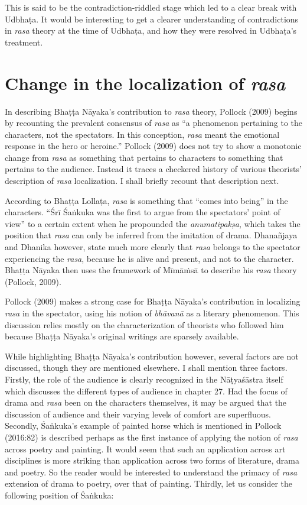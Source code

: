 This is said to be the contradiction-riddled stage which led to a clear break with Udbhaṭa. It would be interesting to get a clearer understanding of contradictions in \textsl{rasa }theory at the time of Udbhaṭa, and how they were resolved in Udbhaṭa’s treatment. 

\section*{Change in the localization of \textsl{rasa}}

In describing Bhaṭṭa Nāyaka’s contribution to \textsl{rasa }theory, Pollock (2009) begins by recounting the prevalent consensus of \textsl{rasa }as “a phenomenon pertaining to the characters, not the spectators. In this conception, \textsl{rasa }meant the emotional response in the hero or heroine.” Pollock (2009) does not try to show a monotonic change from \textsl{rasa} as something that pertains to characters to something that pertains to the audience. Instead it traces a checkered history of various theorists’ description of \textsl{rasa} localization. I shall briefly recount that description next. 

According to Bhaṭṭa Lollaṭa, \textsl{rasa} is something that “comes into being” in the characters. “Śrī Śaṅkuka was the first to argue from the spectators’ point of view” to a certain extent when he propounded the \textsl{anumatipakṣa}, which takes the position that \textsl{rasa} can only be inferred from the imitation of drama. Dhanañjaya and Dhanika however, state much more clearly that \textsl{rasa} belongs to the spectator experiencing the \textsl{rasa}, because he is alive and present, and not to the character. Bhaṭṭa Nāyaka then uses the framework of Mīmāṁsā to describe his \textsl{rasa} theory (Pollock, 2009). 

Pollock (2009) makes a strong case for Bhaṭṭa Nāyaka’s contribution in localizing \textsl{rasa} in the spectator, using his notion of \textsl{bhāvanā} as a literary phenomenon. This discussion relies mostly on the characterization of theorists who followed him because Bhaṭṭa Nāyaka’s original writings are sparsely available. 

While highlighting Bhaṭṭa Nāyaka’s contribution however, several factors are not discussed, though they are mentioned elsewhere. I shall mention three factors. Firstly, the role of the audience is clearly recognized in the Nāṭyaśāstra itself which discusses the different types of audience in chapter 27. Had the focus of drama and \textsl{rasa} been on the characters themselves, it may be argued that the discussion of audience and their varying levels of comfort are superfluous. Secondly, Śaṅkuka’s example of painted horse which is mentioned in Pollock (2016:82) is described perhaps as the first instance of applying the notion of \textsl{rasa} across poetry and painting. It would seem that such an application across art disciplines is more striking than application across two forms of literature, drama and poetry. So the reader would be interested to understand the primacy of \textsl{rasa} extension of drama to poetry, over that of painting. Thirdly, let us consider the following position of Śaṅkuka: 

